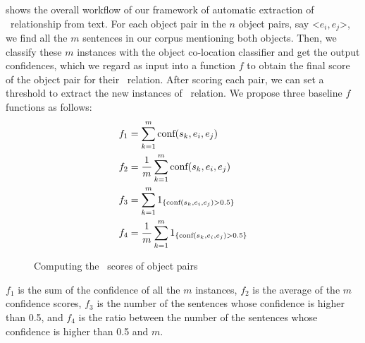  shows the overall workflow of our framework of
automatic extraction of \lnear\ relationship from text. 
For each object pair in the $n$ object pairs, say \textless$e_i,e_j$\textgreater , 
we find all the $m$ sentences in our corpus mentioning both objects. 
Then, we classify these $m$ instances with the object
co-location classifier and get the output confidences, which we regard as input into a function $f$ to obtain the final score of the object pair for their \lnear\ relation. After scoring each pair, we can set a threshold to extract the new instances of \lnear\ relation.
We propose three baseline $f$ functions as follows:
\begin{align*}
	f_1&=\sum_{k=1}^{m} \textnormal{conf}(s_k,e_i,e_j)\\
	f_2&=\frac{1}{m}\sum_{k=1}^{m} \textnormal{conf}(s_k,e_i,e_j)\\
	f_3&=\sum_{k=1}^{m} 
	1_{ \{ \textnormal{conf}(s_k,e_i,e_j)>0.5 \} }\\
	f_4&=\frac{1}{m}\sum_{k=1}^{m} 
	1_{ \{ \textnormal{conf}(s_k,e_i,e_j)>0.5 \} }
\end{align*}

\begin{figure*}[th!]
	\centering
	\caption{Computing the \lnear\ scores of object pairs}
	\label{fig:overview}
\end{figure*}
$f_1$ is the sum of the confidence of all the $m$ instances, $f_2$ is the average of the $m$ confidence scores, 
$f_3$ is the number of the sentences whose confidence is higher than 0.5, 
and $f_4$ is the ratio between the number of the sentences whose confidence is higher than 0.5 and $m$.

